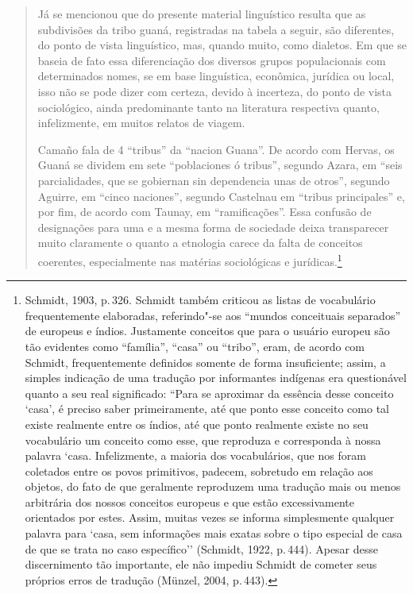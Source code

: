 \begin{quote}
Já se mencionou que do presente material linguístico resulta que as
subdivisões da tribo guaná, registradas na tabela a seguir, são
diferentes, do ponto de vista linguístico, mas, quando muito, como
dialetos. Em que se baseia de fato essa diferenciação dos diversos
grupos populacionais com determinados nomes, se em base linguística,
econômica, jurídica ou local, isso não se pode dizer com certeza, devido
à incerteza, do ponto de vista sociológico, ainda predominante tanto na
literatura respectiva quanto, infelizmente, em muitos relatos de
viagem.

Camaño fala de 4 ``tribus'' da ``nacion Guana''. De acordo com Hervas,
os Guaná se dividem em sete ``poblaciones ó tribus'', segundo Azara, em
``seis parcialidades, que se gobiernan sin dependencia unas de otros'',
segundo Aguirre, em ``cinco naciones'', segundo Castelnau em ``tribus
principales'' e, por fim, de acordo com Taunay, em ``ramificações''.
Essa confusão de designações para uma e a mesma forma de sociedade
deixa transparecer muito claramente o quanto a etnologia carece da falta
de conceitos coerentes, especialmente nas matérias sociológicas e
jurídicas.\footnote{Schmidt, 1903, p.\,326. Schmidt também criticou as
  listas de vocabulário frequentemente elaboradas, referindo"-se aos
  ``mundos conceituais separados'' de europeus e índios. Justamente
  conceitos que para o usuário europeu são tão evidentes como
  ``família'', ``casa'' ou ``tribo'', eram, de acordo com Schmidt,
  frequentemente definidos somente de forma insuficiente; assim, a
  simples indicação de uma tradução por informantes indígenas era
  questionável quanto a seu real significado: ``Para se aproximar da
  essência desse conceito `casa', é preciso saber primeiramente, até que
  ponto esse conceito como tal existe realmente entre os índios, até que
  ponto realmente existe no seu vocabulário um conceito como esse, que
  reproduza e corresponda à nossa palavra `casa. Infelizmente, a
  maioria dos vocabulários, que nos foram coletados entre os povos
  primitivos, padecem, sobretudo em relação aos
  objetos, do fato de que geralmente reproduzem uma tradução mais ou
  menos arbitrária dos nossos conceitos europeus e que estão
  excessivamente orientados por estes. Assim, muitas vezes se informa
  simplesmente qualquer palavra para `casa, sem informações mais exatas
  sobre o tipo especial de casa de que se trata no caso específico''
  (Schmidt, 1922, p.\,444). Apesar desse discernimento tão importante,
  ele não impediu Schmidt de cometer seus próprios erros de tradução
  (Münzel, 2004, p.\,443).}
\end{quote}

